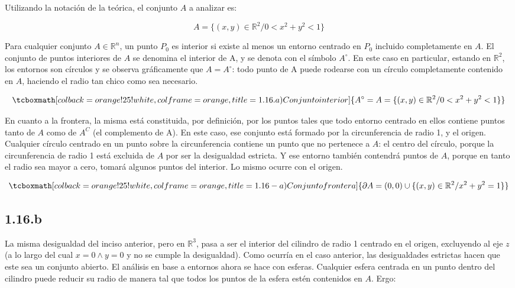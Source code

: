 \documentclass{article}
\renewcommand{\Bbb}{\mathbb}
\begin{document}
Utilizando la notación de la teórica, el conjunto $A$ a analizar es:

\begin{equation}
A = \{ (x,y) \in \Bbb R^2 / 0 < x^2 + y^2 < 1 \}
\end{equation}

Para cualquier conjunto $A \in \Bbb R^n$, un punto $P_0$ es interior si existe al menos un entorno centrado en $P_0$ incluido completamente en $A$. El conjunto de puntos interiores de $A$ se denomina el interior de A, y se denota con el símbolo $A^{\circ}$. En este caso en particular, estando en $\Bbb R^2$, los entornos son círculos y se observa gráficamente que $A = A^{\circ}$: todo punto de A puede rodearse con un círculo completamente contenido en $A$, haciendo el radio tan chico como sea necesario.

\begin{equation}
\tcboxmath[colback=orange!25!white,colframe=orange, title=1.16.a) Conjunto interior]
{ A^{\circ} = A = \{ (x,y) \in \Bbb R^2 / 0 < x^2 + y^2 < 1 \}  }
\end{equation}

En cuanto a la frontera, la misma está constituida, por definición, por los puntos tales que todo entorno centrado en ellos contiene puntos tanto de $A$ como de $A^C$ (el complemento de A). En este caso, ese conjunto está formado por la circunferencia de radio 1, y el origen. Cualquier círculo centrado en un punto sobre la circunferencia contiene un punto que no pertenece a $A$: el centro del círculo, porque la circunferencia de radio 1 está excluida de $A$ por ser la desigualdad estricta. Y ese entorno también contendrá puntos de $A$, porque en tanto el radio sea mayor a cero, tomará algunos puntos del interior. Lo mismo ocurre con el origen.

\begin{equation}
\tcboxmath[colback=orange!25!white,colframe=orange, title=1.16-a) Conjunto frontera]
{ \partial{A} = (0,0) \cup \{ (x,y) \in \Bbb R^2 / x^2 + y^2 = 1 \}  }
\end{equation}

\subsection*{1.16.b}
\label{subsec:1.16.b}

La misma desigualdad del inciso anterior, pero en $\Bbb R^3$, pasa a ser el interior del cilindro de radio 1 centrado en el origen, excluyendo al eje $z$ (a lo largo del cual $x = 0 \wedge y = 0$ y no se cumple la desigualdad). Como ocurría en el caso anterior, las desigualdades estrictas hacen que este sea un conjunto abierto. El análisis en base a entornos ahora se hace con esferas. Cualquier esfera centrada en un punto dentro del cilindro puede reducir su radio de manera tal que todos los puntos de la esfera estén contenidos en $A$. Ergo:
\end{document}
